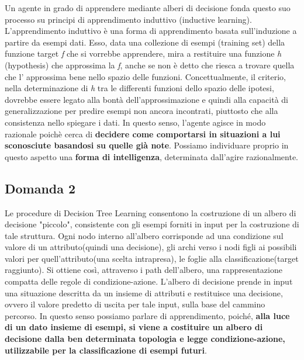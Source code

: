 			Un agente in grado di apprendere mediante alberi di decisione fonda questo suo processo su principi di apprendimento induttivo (\textsf{inductive learning}). L'apprendimento induttivo è una forma di apprendimento basata sull'induzione a partire da esempi dati. Esso, data una collezione di esempi (\textsf{training set}) della funzione \textsf{target} \emph{f} che si vorrebbe apprendere, mira a restituire una funzione \emph{h} (\textsf{hypothesis}) che approssima la \emph{f}, anche se non è detto che riesca a trovare quella che l' approssima bene nello spazio delle funzioni. Concettualmente, il criterio, nella determinazione di \emph{h} tra le differenti funzioni dello spazio delle ipotesi, dovrebbe essere legato alla bontà dell'approssimazione e quindi alla capacità di generalizzazione per predire esempi non ancora incontrati, piuttosto che alla consistenza nello spiegare i dati. In questo senso, l'agente agisce in modo razionale poichè cerca di \textbf{decidere come comportarsi in situazioni a lui sconosciute basandosi su quelle già note}. Possiamo individuare proprio in questo aspetto una \textbf{forma di intelligenza}, determinata dall'agire razionalmente.
		\subsection{Domanda 2}
			Le procedure di \textsf{Decision Tree Learning} consentono la costruzione di un albero di decisione "piccolo", consistente con gli esempi forniti in input per la costruzione di tale struttura. Ogni nodo interno all'albero corrisponde ad una condizione sul valore di un attributo(quindi una decisione), gli archi verso i nodi figli ai possibili valori per quell'attributo(una scelta intrapresa), le foglie alla classificazione(target raggiunto). Si ottiene così, attraverso i \textsf{path} dell'albero, una rappresentazione compatta delle regole di condizione-azione. L'albero di decisione prende in input una situazione descritta da un insieme di attributi e restituisce una decisione, ovvero il valore predetto di uscita per tale input, sulla base del cammino percorso. In questo senso possiamo parlare di apprendimento, poiché, \textbf{alla luce di un dato insieme di esempi, si viene a costituire un albero di decisione dalla ben determinata topologia e legge condizione-azione, utilizzabile per la classificazione di esempi futuri}.
